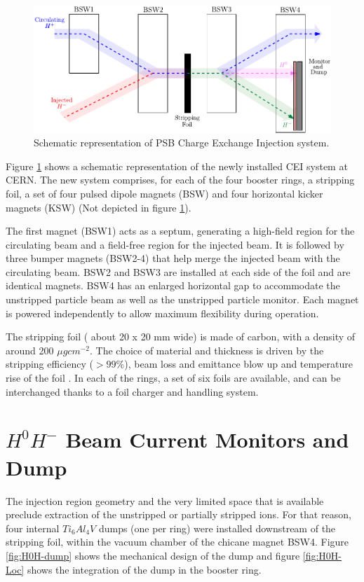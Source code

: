 \begin{figure}[h]
    \centering
    \includegraphics[width=0.75\columnwidth]{Figure_ChargeExchangeSchema/ChargeExSchema.pdf}
    \caption{Schematic representation of PSB \hm Charge Exchange Injection system. }
    \label{fig:SchemaCEI}
\end{figure}

Figure \ref{fig:SchemaCEI} shows a schematic representation of the newly installed CEI system at CERN. The new system comprises, for each of the four booster rings, a stripping foil, a set of four pulsed dipole magnets (BSW) \parencite[][]{ref:BSW} and four horizontal kicker magnets (KSW) \parencite[][]{ref:KSW} (Not depicted in figure \ref{fig:SchemaCEI}). 

The first magnet (BSW1) acts as a septum, generating a high-field region for the circulating beam and a field-free region for the injected \hm beam. It is followed by three bumper magnets (BSW2-4) that help merge the injected beam with the circulating beam. BSW2 and BSW3 are installed at each side of the foil and are identical magnets. BSW4 has an enlarged horizontal gap to accommodate the unstripped particle beam as well as the unstripped particle monitor. Each magnet is powered independently to allow maximum flexibility during operation. 

The stripping foil ( about 20 x 20 mm wide) is made of carbon, with a density of around 200 $\mu g cm^{-2}$. The choice of material and thickness is driven by the stripping efficiency ($> 99 \%$), beam loss and emittance blow up and temperature rise of the foil \parencite[][]{ref:StrippingFoil}. In each of the rings, a set of six foils are available, and can be interchanged thanks to a foil charger and handling system.

\section{$H^{0}H^{-}$  Beam Current Monitors and Dump}


The injection region geometry and the very limited space that is available preclude extraction of the unstripped or partially stripped ions. For that reason, four internal $Ti_{6}Al_{4}V$ dumps (one per ring) were installed downstream of the stripping foil, within the vacuum chamber of the chicane magnet BSW4. Figure \ref{fig:H0H-dump} shows the mechanical design of the dump and figure \ref{fig:H0H-Loc} shows the integration of the dump in the booster ring. 

